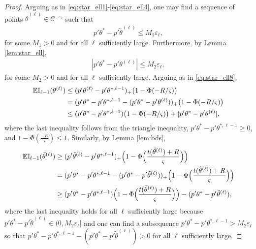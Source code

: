 \documentclass[letterpaper,11pt]{article}
\theoremstyle{myplain}
\theoremstyle{mydefinition}
\theoremstyle{myremark}
\numberwithin{equation}{section}
\numberwithin{figure}{section}
\begin{document}
\begin{appendix}
\begin{proof}
Arguing as in \eqref{eq:star_ell1}-\eqref{eq:star_ell4}, one may find a sequence of points $\tilde\theta^{(\ell)}\in \mathcal C^{-\varepsilon_\ell}$ such that
\begin{align}
p'\theta^*-p'\tilde\theta^{(\ell)}\le M_1 \varepsilon_\ell,\label{eq:star-current1}
\end{align}
for some $M_1>0$ and for all $\ell$ sufficiently large. Furthermore, by Lemma \ref{lem:star_ell},
\begin{align}
|p'\theta^*-p'\theta^{(\ell)}|\le M_2\varepsilon_\ell, \label{eq:star-current2}
\end{align}
for some $M_2>0$ and for all $\ell$ sufficiently large.
Arguing as in \eqref{eq:star_ell8},
\begin{align}
\mathbb{EI}_{\ell-1}(\theta^{(\ell)})&\le (p'\theta^{(\ell)}-p'\theta^{*,\ell-1})_+\bigl(1-\Phi(-R/\varsigma)\bigr)\notag\\
&= (p'\theta^*-p'\theta^{*,\ell-1}-(p'\theta^*-p'\theta^{(\ell)}))_+\bigl(1-\Phi(-R/\varsigma)\bigr)\notag\\
&\le (p'\theta^*-p'\theta^{*,\ell-1})\bigl(1-\Phi(-R/\varsigma)\bigr)+|p'\theta^*-p'\theta^{(\ell)}|,\label{eq:star-current3}
\end{align}
where the last inequality follows from the triangle inequality, $p'\theta^*-p'\theta^{*,\ell-1}\ge 0$, and $1-\Phi(\frac{-R}{\varsigma})\le 1.$
Similarly, by Lemma \ref{lem:bds},
\begin{align}
\mathbb{EI}_{\ell-1}(\tilde\theta^{(\ell)})&\ge (p'\tilde\theta^{(\ell)}-p'\theta^{*,\ell-1})_+\Bigl(1-\Phi\Bigl(\frac{t(\tilde\theta^{(\ell)})+R}{\varsigma}\Bigr)\Bigr)\notag\\
&=(p'\theta^*-p'\theta^{*,\ell-1}-(p'\theta^*-p'\tilde\theta^{(\ell)}))_+\Bigl(1-\Phi\Bigl(\frac{t(\tilde\theta^{(\ell)})+R}{\varsigma}\Bigr)\Bigr)\notag\\
&\ge (p'\theta^*-p'\theta^{*,\ell-1})\Bigl(1-\Phi\Bigl(\frac{t(\tilde\theta^{(\ell)})+R}{\varsigma}\Bigr)\Bigr)-(p'\theta^*-p'\tilde\theta^{(\ell)}),\label{eq:star-current4}
\end{align}
where the last inequality holds for all $\ell$ sufficiently large because  $p'\theta^*-p'\tilde\theta^{(\ell)}\in(0, M_2\varepsilon_\ell]$ and one can find a subsequence $p'\theta^*-p'\theta^{*,\ell-1}>M_2\varepsilon_\ell$ so that $p'\theta^*-p'\theta^{*,\ell-1}-(p'\theta^*-p'\tilde\theta^{(\ell)})>0$ for all $\ell$ sufficiently large.



\end{proof}
\end{appendix}
\end{document}
